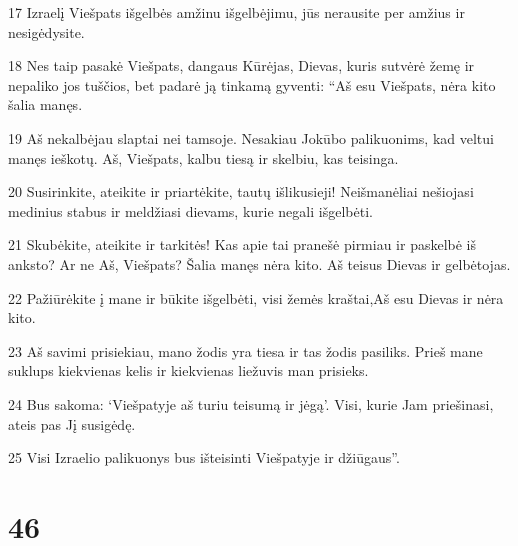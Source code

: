 \par 17 Izraelį Viešpats išgelbės amžinu išgelbėjimu, jūs nerausite per amžius ir nesigėdysite. 
\par 18 Nes taip pasakė Viešpats, dangaus Kūrėjas, Dievas, kuris sutvėrė žemę ir nepaliko jos tuščios, bet padarė ją tinkamą gyventi: “Aš esu Viešpats, nėra kito šalia manęs. 
\par 19 Aš nekalbėjau slaptai nei tamsoje. Nesakiau Jokūbo palikuonims, kad veltui manęs ieškotų. Aš, Viešpats, kalbu tiesą ir skelbiu, kas teisinga. 
\par 20 Susirinkite, ateikite ir priartėkite, tautų išlikusieji! Neišmanėliai nešiojasi medinius stabus ir meldžiasi dievams, kurie negali išgelbėti. 
\par 21 Skubėkite, ateikite ir tarkitės! Kas apie tai pranešė pirmiau ir paskelbė iš anksto? Ar ne Aš, Viešpats? Šalia manęs nėra kito. Aš­ teisus Dievas ir gelbėtojas. 
\par 22 Pažiūrėkite į mane ir būkite išgelbėti, visi žemės kraštai,­Aš esu Dievas ir nėra kito. 
\par 23 Aš savimi prisiekiau, mano žodis yra tiesa ir tas žodis pasiliks. Prieš mane suklups kiekvienas kelis ir kiekvienas liežuvis man prisieks. 
\par 24 Bus sakoma: ‘Viešpatyje aš turiu teisumą ir jėgą’. Visi, kurie Jam priešinasi, ateis pas Jį susigėdę. 
\par 25 Visi Izraelio palikuonys bus išteisinti Viešpatyje ir džiūgaus”.



\chapter{46}


